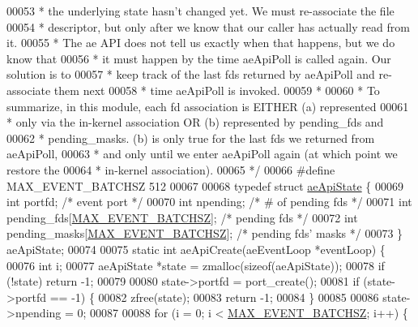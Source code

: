 \begin{DoxyCode}
00053 \textcolor{comment}{ * the underlying state hasn't changed yet.  We must re-associate the file}
00054 \textcolor{comment}{ * descriptor, but only after we know that our caller has actually read from it.}
00055 \textcolor{comment}{ * The ae API does not tell us exactly when that happens, but we do know that}
00056 \textcolor{comment}{ * it must happen by the time aeApiPoll is called again.  Our solution is to}
00057 \textcolor{comment}{ * keep track of the last fds returned by aeApiPoll and re-associate them next}
00058 \textcolor{comment}{ * time aeApiPoll is invoked.}
00059 \textcolor{comment}{ *}
00060 \textcolor{comment}{ * To summarize, in this module, each fd association is EITHER (a) represented}
00061 \textcolor{comment}{ * only via the in-kernel association OR (b) represented by pending\_fds and}
00062 \textcolor{comment}{ * pending\_masks.  (b) is only true for the last fds we returned from aeApiPoll,}
00063 \textcolor{comment}{ * and only until we enter aeApiPoll again (at which point we restore the}
00064 \textcolor{comment}{ * in-kernel association).}
00065 \textcolor{comment}{ */}
00066 \textcolor{preprocessor}{#}\textcolor{preprocessor}{define} \textcolor{preprocessor}{MAX\_EVENT\_BATCHSZ} 512
00067 
00068 \textcolor{keyword}{typedef} \textcolor{keyword}{struct} \hyperlink{structaeApiState}{aeApiState} \{
00069     \textcolor{keywordtype}{int}     portfd;                             \textcolor{comment}{/* event port */}
00070     \textcolor{keywordtype}{int}     npending;                           \textcolor{comment}{/* # of pending fds */}
00071     \textcolor{keywordtype}{int}     pending\_fds[\hyperlink{ae__evport_8c_ab9854fb7f580a9077208ed70f45c8f15}{MAX\_EVENT\_BATCHSZ}];     \textcolor{comment}{/* pending fds */}
00072     \textcolor{keywordtype}{int}     pending\_masks[\hyperlink{ae__evport_8c_ab9854fb7f580a9077208ed70f45c8f15}{MAX\_EVENT\_BATCHSZ}];   \textcolor{comment}{/* pending fds' masks */}
00073 \} aeApiState;
00074 
00075 \textcolor{keyword}{static} \textcolor{keywordtype}{int} aeApiCreate(aeEventLoop *eventLoop) \{
00076     \textcolor{keywordtype}{int} i;
00077     aeApiState *state = zmalloc(\textcolor{keyword}{sizeof}(aeApiState));
00078     \textcolor{keywordflow}{if} (!state) \textcolor{keywordflow}{return} -1;
00079 
00080     state->portfd = port\_create();
00081     \textcolor{keywordflow}{if} (state->portfd == -1) \{
00082         zfree(state);
00083         \textcolor{keywordflow}{return} -1;
00084     \}
00085 
00086     state->npending = 0;
00087 
00088     \textcolor{keywordflow}{for} (i = 0; i < \hyperlink{ae__evport_8c_ab9854fb7f580a9077208ed70f45c8f15}{MAX\_EVENT\_BATCHSZ}; i++) \{

\end{DoxyCode}

